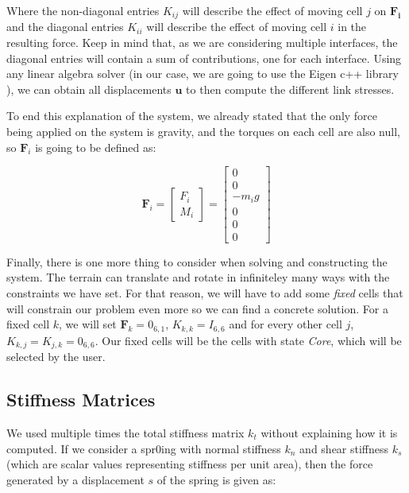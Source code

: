 Where the non-diagonal entries $K_{ij}$ will describe the effect 
of moving cell $j$ on $\mathbf{F_i}$ and the diagonal entries 
$K_{ii}$ will describe the effect of moving cell $i$ in the resulting force.
Keep in mind that, as we are considering multiple interfaces, the diagonal
entries will contain a sum of contributions, one for each interface. Using
any linear algebra solver (in our case, we are going to use the Eigen c++ library \cite{eigenweb}),
we can obtain all displacements $\textbf{u}$ to then compute the different 
link stresses.

\vspace{10pt}

To end this explanation of the system, we already stated that the only force being applied
on the system is gravity, and the torques on each cell are also null, so 
$\mathbf{F}_i$ is going to be defined as:

\begin{equation}
    \mathbf{F}_i = \begin{bmatrix}
        F_i \\
        M_i 
    \end{bmatrix} =
    \begin{bmatrix}
        0 \\
        0 \\
        -m_ig \\
        0 \\
        0 \\
        0
    \end{bmatrix} 
\end{equation} 

Finally, there is one more thing to consider when solving and constructing
the system. The terrain can translate and rotate in infiniteley many ways 
with the constraints we have set. For that reason, we will
have to add some \textit{fixed} cells that will constrain our problem 
even more so we can find a concrete solution. For a fixed cell $k$, 
we will set $\mathbf{F}_k = 0_{6,1}$, $K_{k,k} = I_{6,6}$ and for every other 
cell $j$, $K_{k,j} = K_{j,k} = 0_{6,6}$. Our fixed cells will be the 
cells with state \textit{Core}, which will be selected by the user.                  
\subsection{Stiffness Matrices}
We used multiple times the total stiffness matrix $k_t$ without explaining 
how it is computed. If we consider a spr0ing with normal stiffness $k_n$ and 
shear stiffness $k_s$ (which are scalar values representing stiffness per unit area), then the force 
generated by a displacement $s$ of the spring is given as:

